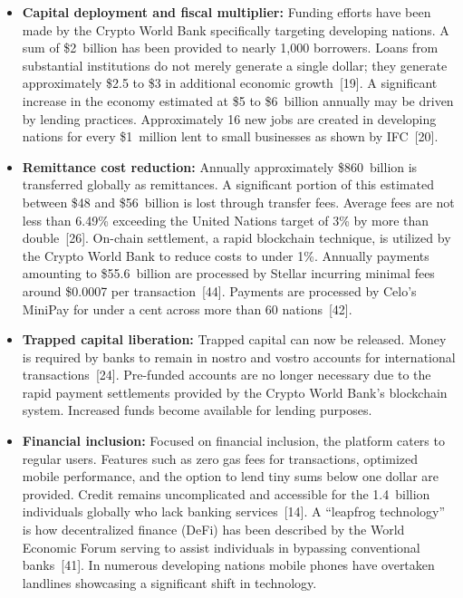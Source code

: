 \documentclass[12pt,a4paper]{report}
\begin{document}
\begin{itemize}[noitemsep]
\item \textbf{Capital deployment and fiscal multiplier:} Funding efforts have been made by the Crypto World Bank specifically targeting developing nations. A sum of \$2~billion has been provided to nearly 1,000 borrowers. Loans from substantial institutions do not merely generate a single dollar; they generate approximately \$2.5 to \$3 in additional economic growth~[19]. A significant increase in the economy estimated at \$5 to \$6~billion annually may be driven by lending practices. Approximately 16 new jobs are created in developing nations for every \$1~million lent to small businesses as shown by IFC~[20].

\item \textbf{Remittance cost reduction:} Annually approximately \$860~billion is transferred globally as remittances. A significant portion of this estimated between \$48 and \$56~billion is lost through transfer fees. Average fees are not less than 6.49\% exceeding the United Nations target of 3\% by more than double~[26]. On-chain settlement, a rapid blockchain technique, is utilized by the Crypto World Bank to reduce costs to under 1\%. Annually payments amounting to \$55.6~billion are processed by Stellar incurring minimal fees around \$0.0007 per transaction~[44]. Payments are processed by Celo's MiniPay for under a cent across more than 60 nations~[42].

\item \textbf{Trapped capital liberation:} Trapped capital can now be released. Money is required by banks to remain in nostro and vostro accounts for international transactions~[24]. Pre-funded accounts are no longer necessary due to the rapid payment settlements provided by the Crypto World Bank's blockchain system. Increased funds become available for lending purposes.

\item \textbf{Financial inclusion:} Focused on financial inclusion, the platform caters to regular users. Features such as zero gas fees for transactions, optimized mobile performance, and the option to lend tiny sums below one dollar are provided. Credit remains uncomplicated and accessible for the 1.4~billion individuals globally who lack banking services~[14]. A ``leapfrog technology'' is how decentralized finance (DeFi) has been described by the World Economic Forum serving to assist individuals in bypassing conventional banks~[41]. In numerous developing nations mobile phones have overtaken landlines showcasing a significant shift in technology.


\end{itemize}
\end{document}
